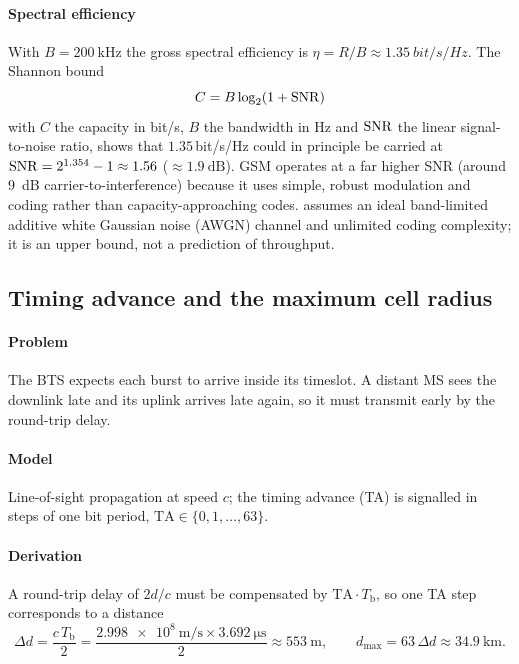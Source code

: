 \documentclass[11pt,a4paper]{article}
\begin{document}
\paragraph{Spectral efficiency} With $B = \qty{200}{\kilo\hertz}$ the gross
spectral efficiency is $\eta = R/B \approx \qty{1.35}{bit/s/Hz}$. The Shannon bound
\cite{shannon1948mathematical}
\begin{equation}\label{eq:shannon}
  C = B\log_2\!\left(1+\mathrm{SNR}\right)
\end{equation}
with $C$ the capacity in bit/s, $B$ the bandwidth in Hz and $\mathrm{SNR}$ the linear
signal-to-noise ratio, shows that $1.35$\,bit/s/Hz could in principle be carried at
$\mathrm{SNR} = 2^{1.354}-1 \approx 1.56$ ($\approx\qty{1.9}{\dB}$). GSM operates at a far
higher SNR (around \qty{9}{\dB} carrier-to-interference) because it uses simple,
robust modulation and coding rather than capacity-approaching codes. 
assumes an ideal band-limited additive white Gaussian noise (AWGN) channel and
unlimited coding complexity; it is an upper bound, not a prediction of throughput.

\subsection{Timing advance and the maximum cell radius}
\paragraph{Problem} The BTS expects each burst to arrive inside its timeslot. A
distant MS sees the downlink late and its uplink arrives late again, so it must
transmit early by the round-trip delay.
\paragraph{Model} Line-of-sight propagation at speed $c$; the timing advance (TA) is
signalled in steps of one bit period, $\mathrm{TA}\in\{0,1,\dots,63\}$.
\paragraph{Derivation} A round-trip delay of $2d/c$ must be compensated by
$\mathrm{TA}\cdot T_{\mathrm{b}}$, so one TA step corresponds to a distance
\begin{equation}\label{eq:tastep}
  \Delta d = \frac{c\,T_{\mathrm{b}}}{2} = \frac{\qty{2.998e8}{\metre\per\second}\times\qty{3.692}{\micro\second}}{2}
  \approx \qty{553}{\metre},
  \qquad d_{\max} = 63\,\Delta d \approx \qty{34.9}{\kilo\metre}.
\end{equation}
\end{document}
